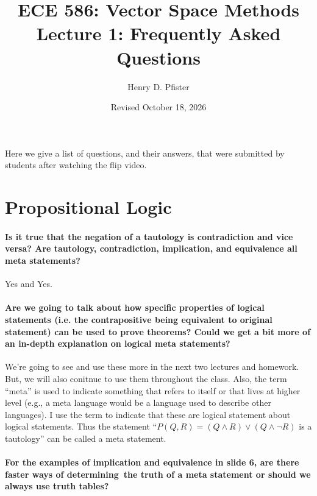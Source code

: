 \documentclass[10pt,english]{article}
\begin{document}
\title{ECE 586: Vector Space Methods \\ Lecture 1: Frequently Asked Questions}
\author{Henry D. Pfister \\ \univ}
\date{Revised October 18, 2026}

\maketitle

Here we give a list of questions, and their answers, that were submitted by students after watching the flip video.

\section{Propositional Logic}


\paragraph{Is it true that the negation of a tautology is contradiction and vice versa? Are tautology, contradiction, implication, and equivalence all meta statements?}

Yes and Yes.

\paragraph{Are we going to talk about how specific properties of logical statements (i.e. the contrapositive being equivalent to original statement) can be used to prove theorems? Could we get a bit more of an in-depth explanation on logical meta statements?}

We're going to see and use these more in the next two lectures and homework.  But, we will also conitnue to use them throughout the class.
Also, the term ``meta'' is used to indicate something that refers to itself or that lives at higher level (e.g., a meta language would be a language used to describe other languages).
I use the term to indicate that these are logical statement about logical statements.
Thus the statement ``$P(Q,R) = (Q \wedge R) \vee (Q \wedge \neg R)$ is a tautology'' can be called a meta statement.

\paragraph{For the examples of implication and equivalence in slide 6, are there faster ways of determining the truth of a meta statement or should we always use truth tables?}
\end{document}

